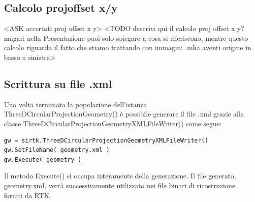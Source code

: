 \documentclass[a4paper,12pt, doubleside]{report}
\begin{document}
        
            \subsection{Calcolo proj\textunderscore offset \textunderscore x/y}
                <ASK accertati proj offset x y>
                <TODO descrivi qui il calcolo proj offset x y? magari nella Presentazione puoi solo spiegare a cosa si riferiscono, mentre questo calcolo riguarda il fatto che stiamo trattando con immagini .mha aventi origine in basso a sinistra>
                
            \subsection{Scrittura su file .xml}
                \par 
                    Una volta terminata la popolazione dell'istanza ThreeDCircularProjectionGeometry() è possibile generare il file .xml grazie alla classe ThreeDCircularProjectionGeometryXMLFileWriter() come segue:
                    \begin{lstlisting}[language=python, frame=bt]
gw = sirtk.ThreeDCircularProjectionGeometryXMLFileWriter()
gw.SetFileName( geometry.xml )
gw.Execute( geometry )
                    \end{lstlisting}
                    Il metodo Execute() si occupa interamente della generazione. Il file generato, geometry.xml, verrà successivamente utilizzato nei file binari di ricostruzione forniti da RTK.
        
\end{document}

